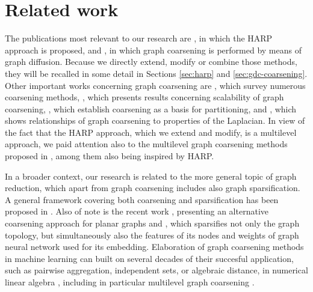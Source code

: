 \section{Related work}

The publications most relevant to our research are \cite{chen_harp_2018}, in which the HARP approach is proposed, and \cite{gasteiger_diffusion_2019}, in which graph coarsening is performed by means of graph diffusion. Because we directly extend, modify or combine those methods, they will be recalled in some detail in Sections \ref{sec:harp} and \ref{sec:gdc-coarsening}. Other important works concerning graph coarsening are \cite{akyildiz_understanding_2020, chen_graph_2022, cai_graph_2022}, which survey numerous coarsening methods, \cite{huang_scaling_2021}, which presents results concerning scalability of graph coarsening, \cite{catalyurek_multithreaded_2012, herrmann_multilevel_2019}, which establish coarsening as a basis for partitioning, and \cite{loukas_graph_2019}, which shows relationships of graph coarsening to properties of the Laplacian. In view of the fact that the HARP approach, which we extend and modify, is a multilevel approach, we paid attention also to the multilevel graph coarsening methods proposed in \cite{bethune_hierarchical_2020, xie_graph_2020, zhang_harp_2021, liu_hierarchical_2021}, among them \cite{zhang_harp_2021} also being inspired by HARP.

In a broader context, our research is related to the more general topic of graph reduction, which apart from graph coarsening includes also graph sparsification. A general framework covering both coarsening and sparsification has been proposed in \cite{bravo_hermsdorff_unifying_2019}. Also of note is the recent work \cite{kammer_space-efficient_2022}, presenting an alternative coarsening approach for planar graphs and \cite{liu_comprehensive_2022}, which sparsifies not only the graph topology, but simultaneously also the features of its nodes and weights of graph neural network used for its embedding. Elaboration of graph coarsening methods in machine learning can built on several decades of their succesful application, such as pairwise aggregation, independent sets, or algebraic distance, in numerical linear algebra \cite{chen_graph_2022}, including in particular multilevel graph coarsening \cite{osei-kuffuor_matrix_2015, ubaru_sampling_2019}.
